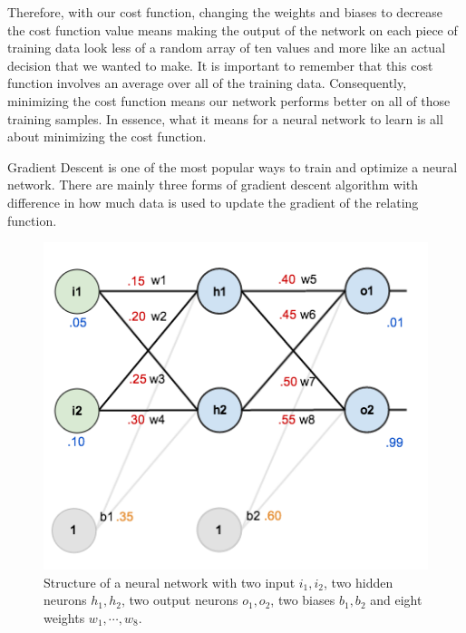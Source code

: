 \documentclass[master]{thesis-uestc}
\begin{document}
Therefore, with our cost function, changing the weights and biases to decrease the cost function value means making the output of the network on each piece of training data look less of a random array of ten values and more like an actual decision that we wanted to make. It is important to remember that this cost function involves an average over all of the training data. Consequently, minimizing the cost function means our network performs better on all of those training samples. In essence, what it means for a neural network to learn is all about minimizing the cost function.

Gradient Descent is one of the most popular ways to train and optimize a neural network. There are mainly three forms of gradient descent algorithm with difference in how much data is used to update the gradient of the relating function.

\begin{figure}[ht]
\includegraphics[width=5in]{pic/network_example2.png}
\caption{Structure of a neural network with two input $i_1, i_2$,  two hidden neurons $h_1, h_2$, two output neurons $o_1, o_2$, two biases $b_1, b_2$ and eight weights $w_1, \cdots, w_8$.}
\label{neural_net_example}
\end{figure}
\end{document}
